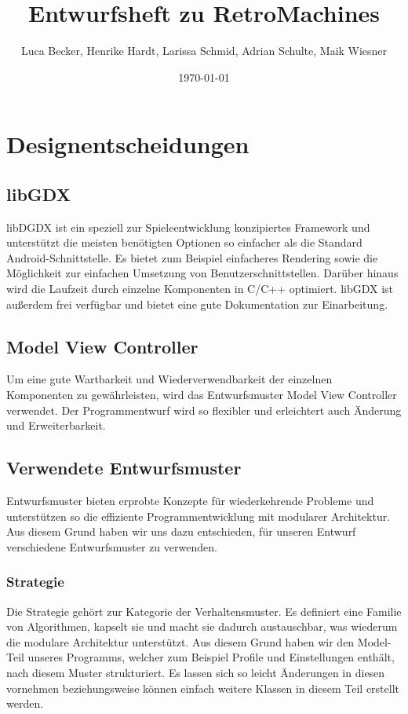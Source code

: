 \documentclass[11pt,a4paper]{report}
\date{\today}
\title{Entwurfsheft zu RetroMachines}
\author{Luca Becker, Henrike Hardt, Larissa Schmid, Adrian Schulte, Maik Wiesner}
\begin{document}
\maketitle
\sloppy
{}
\tableofcontents
\clearpage
\chapter{Designentscheidungen}

\section{libGDX}
libDGDX ist ein speziell zur Spieleentwicklung konzipiertes Framework und unterstützt die meisten benötigten Optionen so einfacher als die Standard Android-Schnittstelle. Es bietet zum Beispiel einfacheres Rendering sowie die Möglichkeit zur einfachen Umsetzung von Benutzerschnittstellen. Darüber hinaus wird die Laufzeit durch einzelne Komponenten in C/C++ optimiert. libGDX ist außerdem frei verfügbar und bietet eine gute Dokumentation zur Einarbeitung.

\section{Model View Controller}

Um eine gute Wartbarkeit und Wiederverwendbarkeit der einzelnen Komponenten zu gewährleisten, wird das Entwurfsmuster Model View Controller verwendet. Der Programmentwurf wird so flexibler und erleichtert auch Änderung und Erweiterbarkeit. 

\section{Verwendete Entwurfsmuster}
Entwurfsmuster bieten erprobte Konzepte für wiederkehrende Probleme und unterstützen so die effiziente Programmentwicklung mit modularer Architektur. Aus diesem Grund haben wir uns dazu entschieden, für unseren Entwurf verschiedene Entwurfsmuster zu verwenden.

\subsection{Strategie}
Die Strategie gehört zur Kategorie der Verhaltensmuster. Es definiert eine Familie von Algorithmen, kapselt sie und macht sie dadurch austauschbar, was wiederum die modulare Architektur unterstützt. Aus diesem Grund haben wir den Model-Teil unseres Programms, welcher zum Beispiel Profile und Einstellungen enthält, nach diesem Muster strukturiert. Es lassen sich so leicht Änderungen in diesen vornehmen beziehungsweise können einfach weitere Klassen in diesem Teil erstellt werden.
\end{document}
